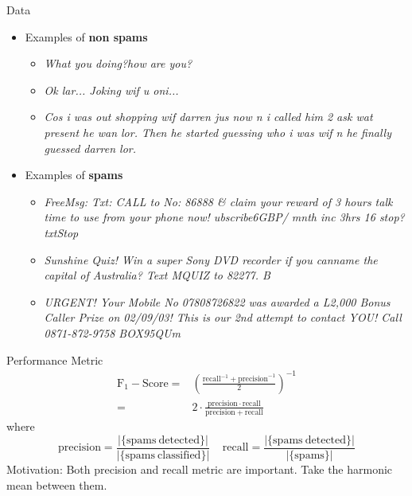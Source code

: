 \documentclass{beamer}
\begin{document}
\begin{frame}{Data}
\begin{itemize}
	\item Examples of \textbf{non spams}
	\begin{itemize}
		\item \textit{What you doing?how are you?}
		\item \textit{Ok lar... Joking wif u oni...} 
		\item \textit{Cos i was out shopping wif darren jus now n i called him 2 ask wat present he wan lor. Then he started guessing who i was wif n he finally guessed darren lor.}
	\end{itemize} 
	\item Examples of \textbf{spams}
	\begin{itemize}
		\item  \textit{FreeMsg: Txt: CALL to No: 86888 \& claim your reward of 3 hours talk time to use from your phone now! ubscribe6GBP/ mnth inc 3hrs 16 stop?txtStop}
		\item  \textit{Sunshine Quiz! Win a super Sony DVD recorder if you canname the capital of Australia? Text MQUIZ to 82277. B}
		\item \textit{URGENT! Your Mobile No 07808726822 was awarded a L2,000 Bonus Caller Prize on 02/09/03! This is our 2nd attempt to contact YOU! Call 0871-872-9758 BOX95QUm}
	\end{itemize}
\end{itemize}
\end{frame}

\begin{frame}{Performance Metric}
\begin{equation}
	\begin{split}
		\mathrm{F_1-Score} =&
		\left(\frac{\mathrm{recall}^{-1} + \mathrm{precision}^{-1}}{2}\right)^{-1}\\
		=&
		2\cdot \frac{\mathrm{precision}\cdot \mathrm{recall}}{\mathrm{precision}+\mathrm{recall}}
	\end{split}
	\end{equation}
	where 
	\begin{equation*}
	\mathrm{precision} = \frac{|\{\mathrm{spams~detected}\}|}{|\{\mathrm{spams~classified}\}|}
	~~~~~
	\mathrm{recall} = \frac{|\{\mathrm{spams~detected}\}|}{|\{\mathrm{spams}\}|}
	\end{equation*}
	Motivation: Both precision and recall metric are important. Take the harmonic mean between them.
\end{frame}
\end{document}
